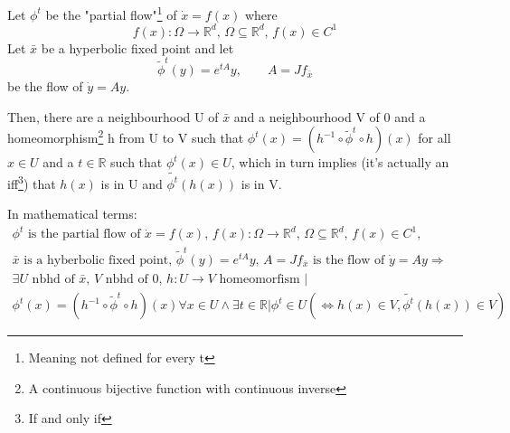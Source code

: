 \begin{theorem}
    Let $\phi^t$ be the "partial flow"\footnote{Meaning not defined for every t} of $\dot{x}=f(x)$ where \begin{equation*}
        f(x): \Omega\rightarrow\mathbb{R}^d,\, \Omega\subseteq \mathbb{R}^{d},\, f(x)\in C^1
    \end{equation*}
    Let $\bar{x}$ be a hyperbolic fixed point and let \begin{equation*}
        \tilde{\phi}^t(y)=e^{tA}y,\qquad A=Jf_{\bar{x}}
    \end{equation*} be the flow of $\dot{y}=Ay$.
    
    Then, there are a neighbourhood U of $\bar{x}$ and a neighbourhood V of 0 and a homeomorphism\footnote{A continuous bijective function with continuous inverse} h from U to V such that $\phi^t(x)=(h^{-1}\circ \tilde{\phi}^t\circ h)(x)$ for all $x\in U$ and a $t\in\mathbb{R}$ such that $\phi^t(x)\in U$, which in turn implies (it's actually an iff\footnote{If and only if}) that $h(x)$ is in U and $\tilde{\phi^t}(h(x))$ is in V.

    In mathematical terms: \begin{align*}
        \phi^t\text{ is the partial flow of }\dot{x}=f(x),\,f(x): \Omega\rightarrow\mathbb{R}^d,\, \Omega\subseteq \mathbb{R}^{d},\, f(x)\in C^1, \\
        \bar{x}\text{ is a hyberbolic fixed point},\, \tilde{\phi}^t(y)=e^{tA}y,\, A=Jf_{\bar{x}}\text{ is the flow of }\dot{y}=Ay \Rightarrow \\
        \exists U \text{ nbhd of } \bar{x},\, V \text{ nbhd of } 0,\, h: U\rightarrow V \text{ homeomorfism } | \\
        \phi^t(x)=(h^{-1}\circ \tilde{\phi}^t\circ h)(x) \forall x\in U \land \exists t \in\mathbb{R}|\phi^{t}\in U(\Leftrightarrow h(x)\in V, \tilde{\phi^t}(h(x))\in V)
    \end{align*}
\end{theorem}

